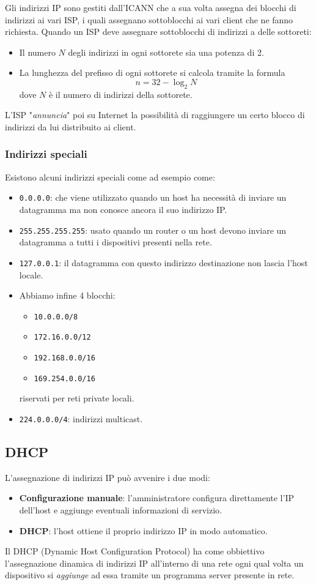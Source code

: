 Gli indirizzi IP sono gestiti dall'ICANN che a sua volta assegna dei 
blocchi di indirizzi ai vari ISP, i quali assegnano sottoblocchi ai 
vari client che ne fanno richiesta. Quando un ISP deve assegnare 
sottoblocchi di indirizzi a delle sottoreti:
\begin{itemize}
	\item Il numero $N$ degli indirizzi in ogni sottorete sia una 
		potenza di 2.
	\item La lunghezza del prefisso di ogni sottorete si calcola 
		tramite la formula
		\[ n = 32 - \log_2 N \]
		dove $N$ è il numero di indirizzi della sottorete.
\end{itemize}
L'ISP "\emph{annuncia}" poi su Internet la possibilità di raggiungere 
un certo blocco di indirizzi da lui distribuito ai client.

\subsubsection{Indirizzi speciali}
Esistono alcuni indirizzi speciali come ad esempio come:
\begin{itemize}
	\item \verb|0.0.0.0|: che viene utilizzato quando un host ha 
		necessità di inviare un datagramma ma non conosce ancora il 
		suo indirizzo IP.
	\item \verb|255.255.255.255|: usato quando un router o un host 
		devono inviare un datagramma a tutti i dispositivi presenti 
		nella rete.
	\item \verb|127.0.0.1|: il datagramma con questo indirizzo 
		destinazione non lascia l'host locale.
	\item Abbiamo infine 4 blocchi:
		\begin{itemize}
			\item \verb|10.0.0.0/8|
			\item \verb|172.16.0.0/12|
			\item \verb|192.168.0.0/16|
			\item \verb|169.254.0.0/16|
		\end{itemize}
		riservati per reti private locali.
	\item \verb|224.0.0.0/4|: indirizzi multicast.
\end{itemize}

\subsection{DHCP}
L'assegnazione di indirizzi IP può avvenire i due modi:
\begin{itemize}
	\item \textbf{Configurazione manuale}: l'amministratore configura 
		direttamente l'IP dell'host e aggiunge eventuali informazioni 
		di servizio.
	\item \textbf{DHCP}: l'host ottiene il proprio indirizzo IP in 
		modo automatico.
\end{itemize}
Il DHCP (Dynamic Host Configuration Protocol) ha come obbiettivo 
l'assegnazione dinamica di indirizzi IP all'interno di una rete ogni
qual volta un dispositivo si \emph{aggiunge} ad essa tramite un 
programma server presente in rete.

